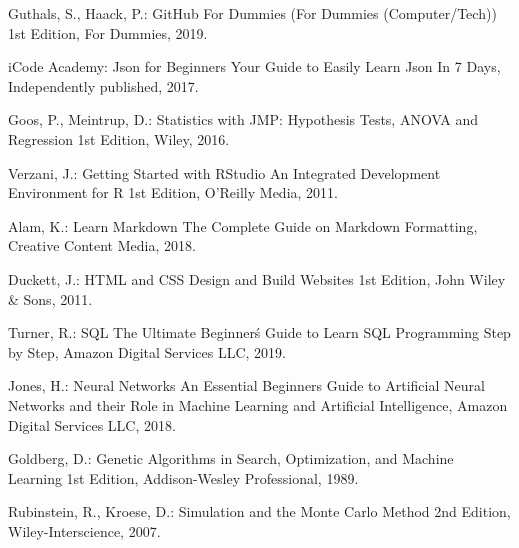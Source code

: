 \documentclass[runningheads,14pt,a4paper,openany]{book}
\begin{document}
\begin{thebibliography}{99}
 Guthals, S., Haack, P.: GitHub For Dummies (For Dummies (Computer/Tech)) 1st Edition, For Dummies, 2019.

 iCode Academy: Json for Beginners Your Guide to Easily Learn Json In 7 Days, Independently published, 2017.

 Goos, P., Meintrup, D.: Statistics with JMP: Hypothesis Tests, ANOVA and Regression 1st Edition, Wiley, 2016. 

 Verzani, J.: Getting Started with RStudio An Integrated Development Environment for R 1st Edition,  O'Reilly Media, 2011.

 Alam, K.: Learn Markdown The Complete Guide on Markdown Formatting, Creative Content Media, 2018.

 Duckett, J.: HTML and CSS Design and Build Websites 1st Edition, John Wiley \& Sons, 2011.

 Turner, R.: SQL The Ultimate Beginner\'s Guide to Learn SQL Programming Step by Step, Amazon Digital Services LLC, 2019.

 Jones, H.: Neural Networks An Essential Beginners Guide to Artificial Neural Networks and their Role in Machine Learning and Artificial Intelligence, Amazon Digital Services LLC, 2018.

 Goldberg, D.: Genetic Algorithms in Search, Optimization, and Machine Learning 1st Edition, Addison-Wesley Professional, 1989.

 Rubinstein, R., Kroese, D.: Simulation and the Monte Carlo Method 2nd Edition, Wiley-Interscience, 2007.

\end{thebibliography}

\newpage
\printindex


\end{document}
